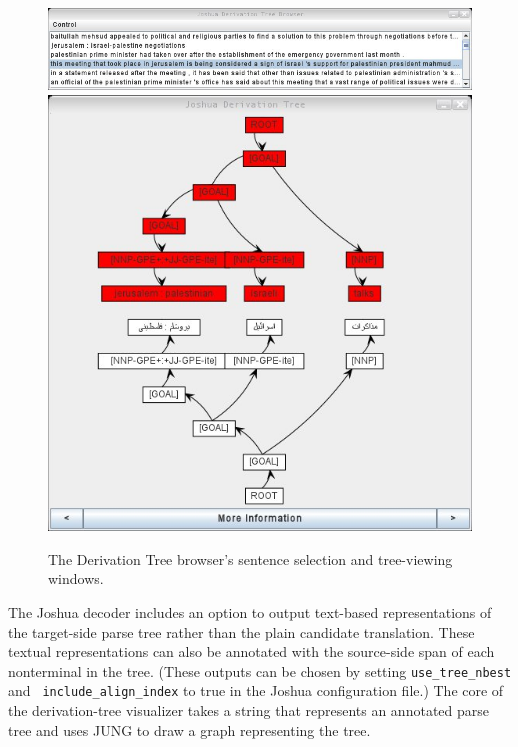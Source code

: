 \documentclass[nologo]{pbml}
\begin{document}
\begin{figure}[t]
\includegraphics[width=.95\linewidth]{images/pick-window-2} 
\includegraphics[width=\linewidth]{images/urdu-tree-window}
\caption{The Derivation Tree browser's sentence selection and tree-viewing windows.}
\label{derivation-figure}
\end{figure}


The Joshua decoder includes an option to output text-based representations
of the target-side parse tree rather than the plain candidate translation.
These textual representations can also be annotated with the source-side
span of each nonterminal in the tree. 
(These outputs can be chosen by setting {\tt use\_tree\_nbest} and {\tt 
include\_align\_index} to true in the Joshua configuration
file.)
The core of the derivation-tree visualizer
 takes a string that represents an annotated parse tree and uses JUNG to draw
a graph representing the tree.
\end{document}
